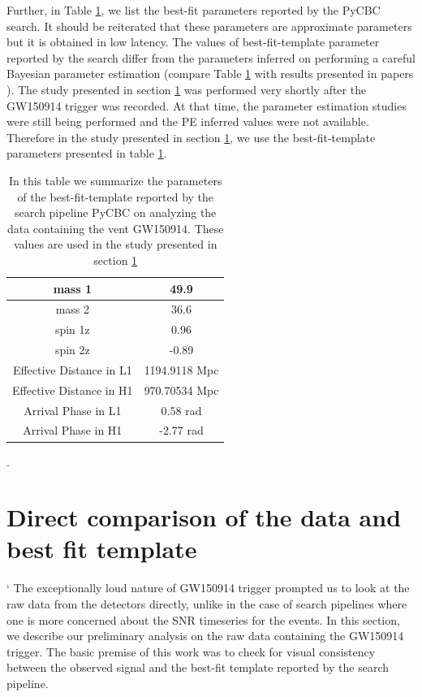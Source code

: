 Further, in Table \ref{tab:best-fitGW150914}, we list the best-fit parameters reported by the PyCBC search. It should be reiterated that these parameters are approximate parameters but it is obtained in low latency. The values of best-fit-template parameter reported by the search differ from the parameters inferred on performing a careful Bayesian parameter estimation (compare Table \ref{tab:best-fitGW150914} with results presented in papers \cite{gw150914PE}). The study presented in section \ref{sec:dirrect-comparision} was performed very shortly after the GW150914 trigger was recorded. At that time, the parameter estimation studies were still being performed and the PE inferred values were not available. Therefore in the study presented in section \ref{sec:dirrect-comparision}, we use the best-fit-template parameters presented in table \ref{tab:best-fitGW150914}.


\begin{table}[h!]
\centering
\begin{tabular}{@{}|c|c|@{}}
\toprule
mass 1                   & 49.9          \\ \midrule
mass 2                   & 36.6          \\ \midrule
spin 1z                  & 0.96          \\ \midrule
spin 2z                  & -0.89         \\ \midrule
Effective Distance in L1 & 1194.9118 Mpc \\ \midrule
Effective Distance in H1 & 970.70534 Mpc \\ \midrule
Arrival Phase in L1      & 0.58 rad      \\ \midrule
Arrival Phase in H1      & -2.77 rad     \\ \bottomrule
\end{tabular}
\caption{In this table we summarize the parameters of the best-fit-template reported by the search pipeline PyCBC on analyzing the data containing the vent GW150914. These values are used in the study presented in section \ref{sec:dirrect-comparision}}.
\label{tab:best-fitGW150914}
\end{table}

\section{Direct comparison of the data and best fit template}
\label{sec:dirrect-comparision}`
The exceptionally loud nature of GW150914 trigger prompted us to look at the raw data from the detectors directly, unlike in the case of search pipelines where one is more concerned about the SNR timeseries for the events.  In this section, we describe our preliminary analysis on the raw data containing the GW150914 trigger.  The basic premise of this work was to check for visual consistency between the observed signal and the best-fit template reported by the search pipeline.

